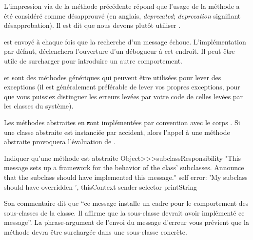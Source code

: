 \documentclass[a4paper,10pt,twoside]{book}
\begin{document}
L'impression via  de la méthode précédente
répond que l'usage de la méthode  a
été considéré comme désapprouvé (en anglais,
\emph{deprecated}; \emph{deprecation} signifiant désapprobation). Il
est dit que nous devons plutôt utiliser .

 est envoyé à chaque fois que la recherche d'un message échoue. L'implémentation par défaut, \ie {} déclenchera l'ouverture d'un débogueur à cet endroit. Il peut être utile de surcharger  pour introduire un autre comportement.


 et  sont des méthodes génériques qui peuvent être utilisées pour lever des exceptions
(il est généralement préférable de lever vos propres exceptions, pour que vous puissiez distinguer les erreurs levées par votre code de celles levées par les classes du système).

Les méthodes abstraites en \st sont implémentées par convention
avec le corps . Si une
classe abstraite est instanciée par accident, alors l'appel à une
méthode abstraite provoquera l'évaluation de
.

\begin{method}{Indiquer qu'une méthode est abstraite}
Object>>>subclassResponsibility
    "This message sets up a framework for the behavior of the class' subclasses.
    Announce that the subclass should have implemented this message."
    self error: 'My subclass should have overridden ', thisContext sender selector printString
\end{method}

Son commentaire dit que ``ce message installe un cadre pour le
comportement des sous-classes de la classe. Il affirme que la sous-classe
devrait avoir implémenté ce message''. La phrase-argument de
l'envoi du message d'erreur  vous prévient que la
méthode devra être surchargée dans une sous-classe concrète.
\end{document}
